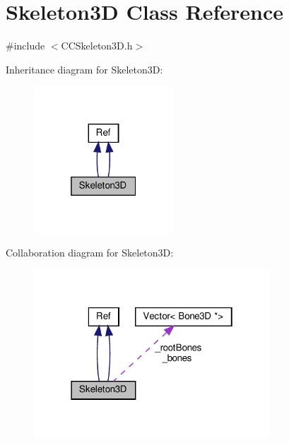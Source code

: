 \hypertarget{classSkeleton3D}{}\section{Skeleton3D Class Reference}
\label{classSkeleton3D}


{\ttfamily \#include $<$C\+C\+Skeleton3\+D.\+h$>$}



Inheritance diagram for Skeleton3D\+:
\nopagebreak
\begin{figure}[H]
\begin{center}
\leavevmode
\includegraphics[width=148pt]{classSkeleton3D__inherit__graph}
\end{center}
\end{figure}


Collaboration diagram for Skeleton3D\+:
\nopagebreak
\begin{figure}[H]
\begin{center}
\leavevmode
\includegraphics[width=250pt]{classSkeleton3D__coll__graph}
\end{center}
\end{figure}
